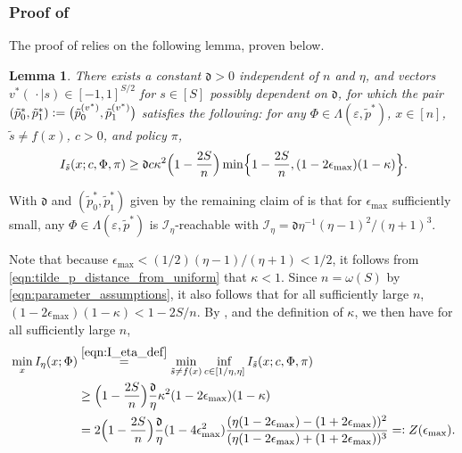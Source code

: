 \documentclass[11pt]{article}
\newcommand{\defeq}{=\vcentcolon}
\newcommand{\eqdef}{\vcentcolon=}
\newcommand{\mf}[1]{\mathfrak{#1}}
\newcommand{\mcI}{\mathcal{I}}
\newtheorem{lemma}[theorem]{Lemma}
\theoremstyle{definition}
\theoremstyle{definition}
\begin{document}
\subsubsection{Proof of \texorpdfstring{}{identifiability}}

The proof of  relies on the following lemma, proven below.
\begin{lemma}
	\label{lem:bound_on_information_quantity}
	There exists a constant $\mf{d}>0$
	independent of $n$ and $\eta$,
	and vectors $v^*(\,\cdot\mid  s)\in [-1,1]^{S/2}$ for $s\in[S]$ possibly dependent on $\mf{d}$,
	for which the pair $(\tilde{p}^*_0,\tilde{p}^*_1) \eqdef \bigl(\tilde{p}_0^{(v^*)}, \tilde{p}_1^{(v^*)}\bigr)$ satisfies the following:
	for any $\Phi\in \Lambda(\varepsilon,\tilde{p}^*)$, $x \in[n]$, $\tilde{s} \neq f(x)$, $c>0$, and policy $\pi$,
	\begin{equation}
		I_{\tilde{s}}(x;c,\Phi,\pi)
		\geq
		\mf{d}c\kappa^2\Bigl(1-\frac{2S}{n}\Bigr)
		\min\Bigl\{1-\frac{2S}{n},(1-2\epsilon_{\max})(1-\kappa)\Bigr\}
		.
		\label{eqn:kernel_allows_identifiability}
	\end{equation}
\end{lemma}
With $\mf{d}$ and $(\tilde{p}^*_0,\tilde{p}^*_1)$ given by  the remaining claim of  is that for $\epsilon_{\max}$ sufficiently small, any $\Phi\in\Lambda(\varepsilon,\tilde{p}^*)$ is $\mcI_{\eta}$-reachable with $\mathcal{I}_{\eta} = \mf{d}\eta^{-1}(\eta-1)^2/(\eta+1)^3$.

Note that because $\epsilon_{\max}<(1/2)(\eta-1)/(\eta+1)<1/2$, it follows from \eqref{eqn:tilde_p_distance_from_uniform} that $\kappa<1$.
Since $n=\omega(S)$ by \eqref{eqn:parameter_assumptions}, it also follows that for all sufficiently large $n$, $(1-2\epsilon_{\max})(1-\kappa)<1-2S/n$.
By , and the definition of $\kappa$, we then have for all sufficiently large $n$,
\begin{align}
	\min_{x }
	I_{\eta}(x;\Phi)
	 &
	\overset{\eqref{eqn:I_eta_def}}{=}
	\min_{\tilde{s}\neq f(x)}
	\inf_{c\in[1/\eta,\eta]}
	I_{\tilde{s}}(x;c,\Phi,\pi)
	\nonumber
	\\
	 &
	\geq
	\Bigl(1-\frac{2S}{n}\Bigr)\frac{\mf{d}}{\eta}
	\kappa^2
	(1-2\epsilon_{\max})(1-\kappa)
	\nonumber
	\\
	&
	=
	2\Bigl(1-\frac{2S}{n}\Bigr)\frac{\mf{d}}{\eta}
	(1-4\epsilon_{\max}^2)
	\frac{(\eta(1-2\epsilon_{\max})-(1+2\epsilon_{\max}))^2}{(\eta(1-2\epsilon_{\max})+(1+2\epsilon_{\max}))^3}
	\defeq
	Z(\epsilon_{\max})
	.
\end{align}
\end{document}
